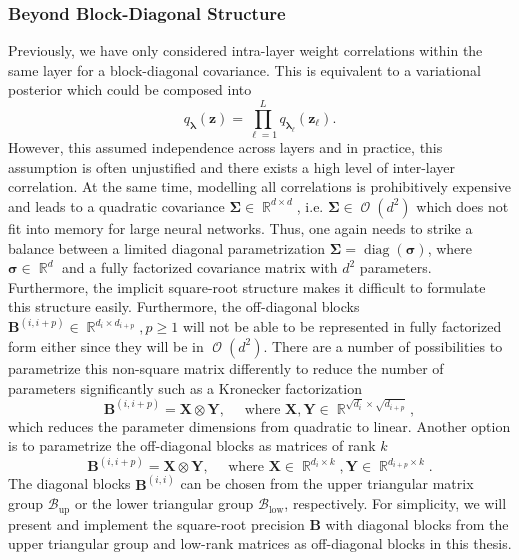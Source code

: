 \documentclass[a4paper, 11pt, oneside]{scrartcl}
\theoremstyle{break}
\DeclareMathOperator{\Real}{\mathbb{R}}
\DeclareMathOperator{\diag}{diag}
\DeclareMathOperator{\BigO}{\mathcal{O}}
\newcommand{\matr}[1]{\boldsymbol{#1}}
\newcommand{\set}[1]{\mathcal{#1}}
\numberwithin{equation}{section}
\begin{document}
			\subsubsection{Beyond Block-Diagonal Structure}
				Previously, we have only considered intra-layer weight correlations within the same layer for a block-diagonal covariance.
				This is equivalent to a variational posterior which could be composed into 
				\begin{equation*}
					q_{\matr{\lambda}} (\matr{z}) = \prod_{\ell=1}^L q_{\matr{\lambda}_{\ell}} (\matr{z}_{\ell}).
				\end{equation*}
				However, this assumed independence across layers and in practice, this assumption is often unjustified and there exists a high level of inter-layer correlation.
				At the same time, modelling all correlations is prohibitively expensive and leads to a quadratic covariance $\matr{\Sigma} \in \Real^{d \times d}$, i.e. $\matr{\Sigma} \in \BigO (d^2)$ which does not fit into memory for large neural networks.
				Thus, one again needs to strike a balance between a limited diagonal parametrization $\matr{\Sigma} = \diag (\matr{\sigma})$, where $\matr{\sigma} \in \Real^d$ and a fully factorized covariance matrix with $d^2$ parameters.
				Furthermore, the implicit square-root structure makes it difficult to formulate this structure easily.
				Furthermore, the off-diagonal blocks $\matr{B}^{(i, i+p)} \in \Real^{d_i \times d_{i+p}}, p \ge 1$ will not be able to be represented in fully factorized form either since they will be in $\BigO (d^2)$.
				There are a number of possibilities to parametrize this non-square matrix differently to reduce the number of parameters significantly such as a Kronecker factorization
					\[
						\matr{B}^{(i, i+p)} = \matr{X} \otimes \matr{Y}, \quad \text{ where } \matr{X}, \matr{Y} \in \Real^{\sqrt{d_i} \times \sqrt{d_{i+p}}},
					\]
				which reduces the parameter dimensions from quadratic to linear.
				Another option is to parametrize the off-diagonal blocks as matrices of rank $k$
					\[
						\matr{B}^{(i, i+p)} = \matr{X} \otimes \matr{Y}, \quad \text{ where } \matr{X} \in \Real^{d_i \times k}, \matr{Y} \in \Real^{d_{i+p} \times k}.
					\]
				The diagonal blocks $\matr{B}^{(i, i)}$ can be chosen from the upper triangular matrix group $\set{B}_{\text{up}}$ or the lower triangular group $\set{B}_{\text{low}}$, respectively.
				For simplicity, we will present and implement the square-root precision $\matr{B}$ with diagonal blocks from the upper triangular group and low-rank matrices as off-diagonal blocks in this thesis.
\end{document}
